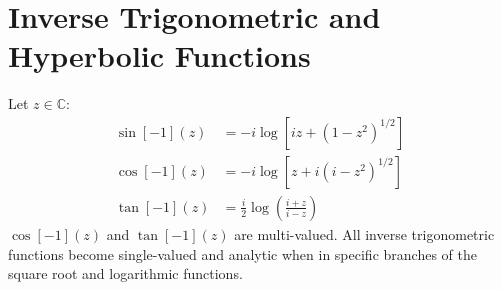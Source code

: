 \documentclass[12pt, english]{book}
\begin{document}
	\section{Inverse Trigonometric and Hyperbolic Functions} \label{Inverse Trigonometric and Hyperbolic Functions Section - Complex}
	
	\begin{definition}
		\label{Inverse Trigonometric Functions Definition - Complex}
		Let \(z \in \mathbb{C}\):
		\begin{align*}
			\sin[-1](z) &= -i \log[iz + (1-z^2)^{1/2}] \\
			\cos[-1](z) &= -i \log[z + i(i-z^2)^{1/2}] \\
			\tan[-1](z) &= \frac{i}{2} \log\left(\frac{i + z}{i - z}\right)
		\end{align*}
		\(\cos[-1](z)\) and \(\tan[-1](z)\) are multi-valued. All inverse trigonometric functions become single-valued and analytic when in specific branches of the square root and logarithmic functions. 
	\end{definition}
\end{document}
